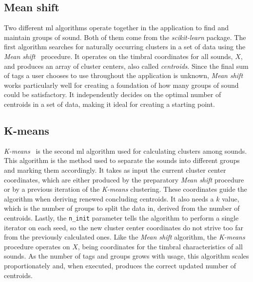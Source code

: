 \subsection{Mean shift}\label{sub:mean_shift}
Two different \gls{ml} algorithms operate together in the application to find and maintain groups of sound. Both of them come from the \emph{scikit-learn} package. The first algorithm searches for naturally occurring clusters in a set of data using the \emph{Mean shift}~\cite{mean_shift} procedure. It operates on the timbral coordinates for all sounds, \(X\), and produces an array of cluster centers, also called \emph{centroids}. Since the final sum of tags a user chooses to use throughout the application is unknown, \emph{Mean shift} works particularly well for creating a foundation of how many groups of sound could be satisfactory. It independently decides on the optimal number of centroids in a set of data, making it ideal for creating a starting point.
\begin{mdframed}[style=code]
    
\end{mdframed}

\subsection{K-means}\label{sub:k-means}
\emph{K-means}~\cite{k-means} is the second \gls{ml} algorithm used for calculating clusters among sounds. This algorithm is the method used to separate the sounds into different groups and marking them accordingly. It takes as input the current cluster center coordinates, which are either produced by the preparatory \emph{Mean shift} procedure or by a previous iteration of the \emph{K-means} clustering. These coordinates guide the algorithm when deriving renewed concluding centroids. It also needs a \(k\) value, which is the number of groups to split the data in, derived from the number of centroids. Lastly, the \texttt{n\_init} parameter tells the algorithm to perform a single iterator on each seed, so the new cluster center coordinates do not strive too far from the previously calculated ones. Like the \emph{Mean shift} algorithm, the \emph{K-means} procedure operates on \(X\), being coordinates for the timbral characteristics of all sounds. As the number of tags and groups grows with usage, this algorithm scales proportionately and, when executed, produces the correct updated number of centroids.
\begin{mdframed}[style=code]
    
\end{mdframed}

